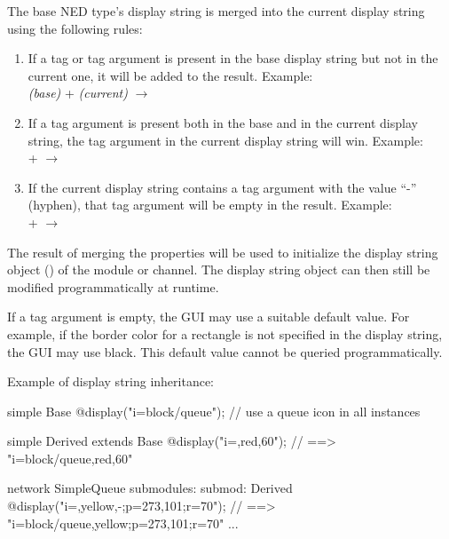 The base NED type's display string is merged into the current display string
using the following rules:

\begin{enumerate}
\item {} If a tag or tag argument is present in the base
    display string but not in the current one, it will be added to the
    result. Example: \\
     \textit{(base)} +  \textit{(current)} $\rightarrow$ 
\item {} If a tag argument is present both in the base
    and in the current display string, the tag argument in the current
    display string will win. Example: \\
     +  $\rightarrow$ 
\item {} If the current display string contains a tag argument
    with the value ``-'' (hyphen), that tag argument will be empty in
    the result. Example: \\
     +  $\rightarrow$ 
\end{enumerate}

The result of merging the  properties will be used to
initialize the display string object () of the
module or channel. The display string object can then still be modified
programmatically at runtime.

\begin{note}
If a tag argument is empty, the GUI may use a suitable default value. For
example, if the border color for a rectangle is not specified in the
display string, the GUI may use black. This default value cannot be
queried programmatically.
\end{note}

Example of display string inheritance:

\begin{ned}
simple Base {
    @display("i=block/queue"); // use a queue icon in all instances
}

simple Derived extends Base {
    @display("i=,red,60");  // ==> "i=block/queue,red,60"
}

network SimpleQueue {
    submodules:
        submod: Derived {
            @display("i=,yellow,-;p=273,101;r=70");
                     // ==> "i=block/queue,yellow;p=273,101;r=70"
        }
        ...
}
\end{ned}


